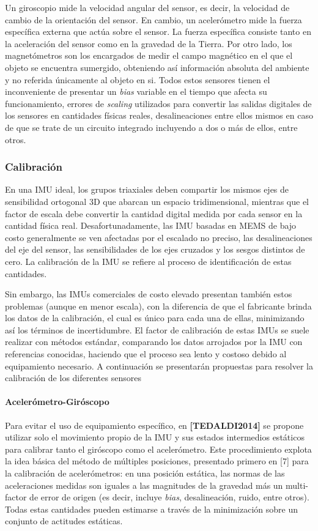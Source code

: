 Un giroscopio mide la velocidad angular del sensor, es decir, la velocidad de cambio de la orientación del sensor. En cambio, un acelerómetro mide la fuerza específica externa que actúa sobre el sensor. La fuerza específica consiste tanto en la aceleración del sensor como en la gravedad de la Tierra. Por otro lado, los magnetómetros son los encargados de medir el campo magnético en el que el objeto se encuentra sumergido, obteniendo así información absoluta del ambiente y no referida únicamente al objeto en si. Todos estos sensores tienen el inconveniente de presentar un \textit{bias} variable en el tiempo que afecta su funcionamiento, errores de \textit{scaling} utilizados para convertir las salidas digitales de los sensores en cantidades físicas reales, desalineaciones entre ellos mismos en caso de que se trate de un circuito integrado incluyendo a dos o más de ellos, entre otros.

\subsubsection{Calibración}
En una IMU ideal, los grupos triaxiales deben compartir los mismos ejes de sensibilidad ortogonal 3D que abarcan un espacio tridimensional, mientras que el factor de escala debe convertir la cantidad digital medida por cada sensor en la cantidad física real. Desafortunadamente, las IMU basadas en MEMS de bajo costo generalmente se ven afectadas por el escalado no preciso, las desalineaciones del eje del sensor, las sensibilidades de los ejes cruzados y los sesgos distintos de cero. La calibración de la IMU se refiere al proceso de identificación de estas cantidades.

Sin embargo, las IMUs comerciales de costo elevado presentan también estos problemas (aunque en menor escala), con la diferencia de que el fabricante brinda los datos de la calibración, el cual es único para cada una de ellas, minimizando así los términos de incertidumbre. El factor de calibración de estas IMUs se suele realizar con métodos estándar, comparando los datos arrojados por la IMU con referencias conocidas, haciendo que el proceso sea lento y costoso debido al equipamiento necesario. A continuación se presentarán propuestas para resolver la calibración de los diferentes sensores

\paragraph{Acelerómetro-Giróscopo}
Para evitar el uso de equipamiento específico, en \textbf{[TEDALDI2014]} se propone utilizar solo el movimiento propio de la IMU y sus estados intermedios estáticos para calibrar tanto el giróscopo como el acelerómetro. Este procedimiento explota la idea básica del método de múltiples posiciones, presentado primero en [7] para la calibración de acelerómetros: en una posición estática, las normas de las aceleraciones medidas son iguales a las magnitudes de la gravedad más un multi-factor de error de origen (es decir, incluye \textit{bias}, desalineación, ruido, entre otros). Todas estas cantidades pueden estimarse a través de la minimización sobre un conjunto de actitudes estáticas. 

